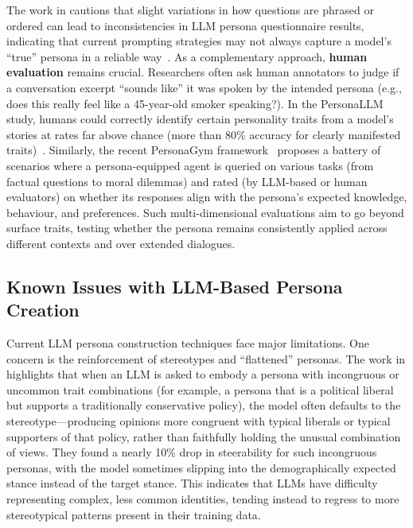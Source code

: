 The work in \citet{shu-etal-2024-personality-tests} cautions that slight variations in how questions are phrased or ordered can lead to inconsistencies in LLM persona questionnaire results, indicating that current prompting strategies may not always capture a model’s ``true'' persona in a reliable way~\cite{shu-etal-2024-personality-tests}. As a complementary approach, \textbf{human evaluation} remains crucial. Researchers often ask human annotators to judge if a conversation excerpt ``sounds like'' it was spoken by the intended persona (e.g., does this really feel like a 45-year-old smoker speaking?). In the PersonaLLM study, humans could correctly identify certain personality traits from a model's stories at rates far above chance (more than 80\% accuracy for clearly manifested traits)~\cite{jiang-etal-2023-personallm}. Similarly, the recent PersonaGym framework~\cite{samuel2025personagymevaluatingpersonaagents} proposes a battery of scenarios where a persona-equipped agent is queried on various tasks (from factual questions to moral dilemmas) and rated (by LLM-based or human evaluators) on whether its responses align with the persona’s expected knowledge, behaviour, and preferences. Such multi-dimensional evaluations aim to go beyond surface traits, testing whether the persona remains consistently applied across different contexts and over extended dialogues.


\subsection*{Known Issues with LLM-Based Persona Creation}
Current LLM persona construction techniques face major limitations. One concern is the reinforcement of stereotypes and ``flattened'' personas. The work in \citet{liu-etal-2024-evaluating-large} highlights that when an LLM is asked to embody a persona with incongruous or uncommon trait combinations (for example, a persona that is a political liberal but supports a traditionally conservative policy), the model often defaults to the stereotype---producing opinions more congruent with typical liberals or typical supporters of that policy, rather than faithfully holding the unusual combination of views. They found a nearly 10\% drop in steerability for such incongruous personas, with the model sometimes slipping into the demographically expected stance instead of the target stance. This indicates that LLMs have difficulty representing complex, less common identities, tending instead to regress to more stereotypical patterns present in their training data.

